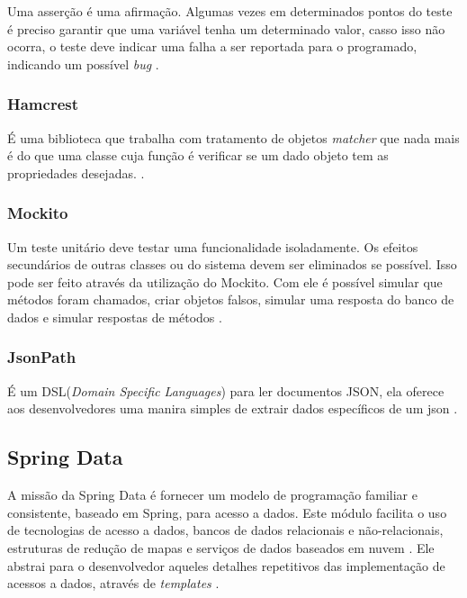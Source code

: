 Uma asserção é uma afirmação. Algumas vezes em determinados pontos do teste é preciso garantir que uma variável tenha um determinado valor, casso isso não ocorra, o teste deve indicar uma falha a ser reportada para o programado, indicando um possível \textit{bug} \cite{junit:2017}.
	
\subsubsection{Hamcrest}\label{subsec:Hamcrest}

	É uma biblioteca que trabalha com tratamento de objetos \textit{matcher} que nada mais é do que uma classe cuja função é verificar se um dado objeto tem as propriedades desejadas. \cite{hamcrest:2017}.

\subsubsection{Mockito}\label{subsec:Mockito}
	
	Um teste unitário deve testar uma funcionalidade isoladamente. Os efeitos secundários de outras classes ou do sistema devem ser eliminados  se possível. Isso pode ser feito através da utilização do Mockito. Com ele é possível simular que métodos foram chamados, criar objetos falsos, simular uma resposta do banco de dados e simular respostas de métodos \cite{mockito:2017}.

\subsubsection{JsonPath}\label{subsec:JsonPath}

	É um  DSL(\textit{Domain Specific Languages}) para ler documentos JSON, ela oferece aos desenvolvedores uma manira simples de extrair dados específicos de um json \cite{JsonPath:2017}.


\subsection{Spring Data}\label{subsec:SpringData}

A missão da Spring Data é fornecer um modelo de programação familiar e consistente, baseado em Spring, para acesso a dados. Este módulo facilita o uso de tecnologias de acesso a dados, bancos de dados relacionais e não-relacionais, estruturas de redução de mapas e serviços de dados baseados em nuvem \cite{springData:2017}. Ele abstrai para o desenvolvedor aqueles detalhes repetitivos das implementação de acessos a dados, através de \textit{templates} \cite{Weissmann:2012}.

